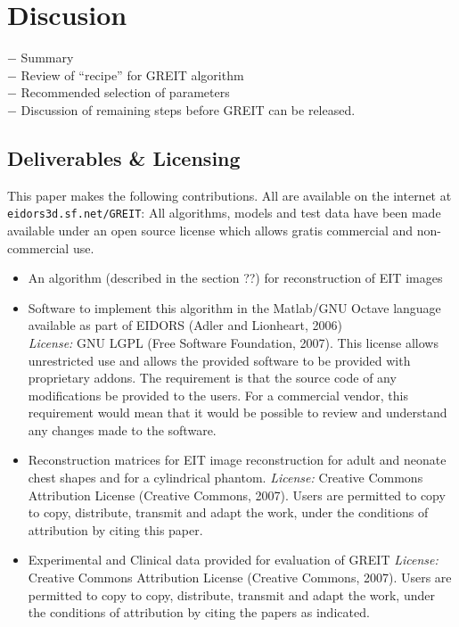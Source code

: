 \documentclass[12pt]{iopart}
\begin{document}
\section{Discusion}

$-$ Summary
\\
$-$ Review of ``recipe'' for GREIT algorithm
\\
$-$ Recommended selection of parameters
\\
$-$ Discussion of remaining steps before 
    GREIT can be released.
    


\subsection{Deliverables \& Licensing}

This paper makes the following contributions. All are
available on the internet at \verb+eidors3d.sf.net/GREIT+:
All algorithms, models and test data have been made available
under an open source license which allows
gratis commercial and non-commercial use.
\begin{itemize}
\item An algorithm (described in the section ??) for reconstruction
         of EIT images
\item Software to implement this algorithm in the Matlab/GNU Octave
         language available as part of EIDORS (Adler and Lionheart, 2006)
\\
{\em License:}
    GNU LGPL (Free Software Foundation, 2007).
   This license allows
   unrestricted use and allows the provided software to
   be provided with proprietary addons. The requirement is
   that the source code of any modifications be provided to
   the users. For a commercial vendor, this requirement would
   mean that it would be possible to review and understand any
   changes made to the software.

\item Reconstruction matrices for EIT image reconstruction for
      adult and neonate chest shapes and for a cylindrical phantom.
{\em License:} Creative Commons Attribution
   License (Creative Commons, 2007). Users are permitted
   to copy to copy, distribute, transmit and adapt the work,
   under the conditions of attribution by citing this paper.

\item Experimental and Clinical data provided for evaluation of GREIT
{\em License:} Creative Commons Attribution
   License (Creative Commons, 2007). Users are permitted
   to copy to copy, distribute, transmit and adapt the work,
   under the conditions of attribution by citing the
   papers as indicated.
\end{itemize}
\end{document}
